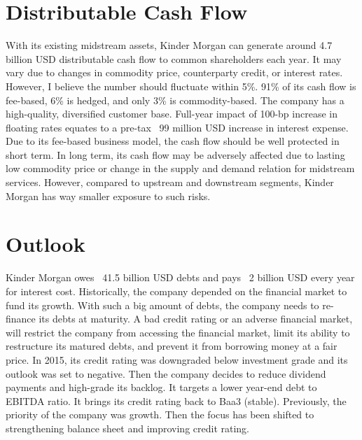 \documentclass[11pt]{article}
\begin{document}
\section{Distributable Cash Flow}

With its existing midstream assets, Kinder Morgan can generate around 4.7 billion USD distributable cash flow to common shareholders each year. It may vary due to changes in commodity price, counterparty credit, or interest rates. However, I believe the number should fluctuate within 5\%. 91\% of its cash flow is fee-based, 6\% is hedged, and only 3\% is commodity-based.  The company has a high-quality, diversified customer base. Full-year impact of 100-bp increase in floating rates equates to a pre-tax ~99 million USD increase in interest expense. Due to its fee-based business model, the cash flow should be well protected in short term. In long term, its cash flow may be adversely affected due to lasting low commodity price or change in the supply and demand relation for midstream services. However, compared to upstream and downstream segments, Kinder Morgan has way smaller exposure to such risks. 

\section{Outlook}
   
Kinder Morgan owes ~41.5 billion USD debts and pays ~2 billion USD every year for interest cost. Historically, the company depended on the financial market to fund its growth. With such a big amount of debts, the company needs to re-finance its debts at maturity. A bad credit rating or an adverse financial market, will restrict the company from accessing the financial market, limit its ability to restructure its matured debts, and prevent it from borrowing money at a fair price. In 2015, its credit rating was downgraded below investment grade and its outlook was set to negative. Then the company decides to reduce dividend payments and high-grade its backlog. It targets a lower year-end debt to EBITDA ratio. It brings its credit rating back to Baa3 (stable). Previously, the priority of the company was growth. Then the focus has been shifted to strengthening balance sheet and improving credit rating. 
\end{document}
